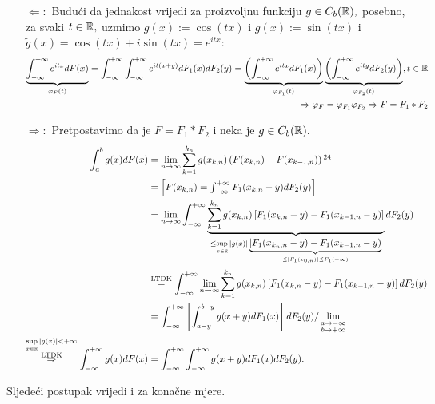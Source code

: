 \documentclass{article}
\begin{document}
\begin{itemize}
    \item[\(\boxed{\Leftarrow}:\)] Budući da jednakost vrijedi za proizvoljnu funkciju \(g\in C_b(\Bbb R),\) posebno, za svaki \(t\in\Bbb R,\) uzmimo \(g(x):=\cos(tx)\) i \(g(x):=\sin(tx)\) i \(\tilde g(x)=\cos(tx)+i\sin(tx)=e^{itx}\): \[\begin{aligned}\underbrace{\int_{-\infty}^{+\infty}e^{itx}dF(x)}_{\varphi_F(t)}=\int_{-\infty}^{+\infty}\int_{-\infty}^{+\infty}e^{it(x+y)}dF_1(x)dF_2(y)=\underbrace{\left(\int_{-\infty}^{+\infty}e^{itx}dF_1(x)\right)}_{\varphi_{F_1}(t)}\underbrace{\left(\int_{-\infty}^{+\infty}e^{ity}dF_2(y)\right)}_{\varphi_{F_2}(t)},t\in\Bbb R\\\Rightarrow\varphi_F=\varphi_{F_1}\varphi_{F_2}\Rightarrow F=F_1*F_2\end{aligned}\] 
    \item[\(\boxed{\Rightarrow}:\)] Pretpostavimo da je \(F=F_1*F_2\) i neka je \(g\in C_b(\Bbb R).\)   \[\begin{aligned}\int_a^bg(x)dF(x)&=\lim_{n\to\infty}\sum_{k=1}^{k_n}g(x_{k,n})\left(F(x_{k,n})-F(x_{k-1,n})\right)\footnotemark[24]\\&=\begin{bmatrix}F(x_{k,n})=\int_{-\infty}^{+\infty}F_1(x_{k,n}-y)dF_2(y)\end{bmatrix}\\&=\lim_{n\to\infty}\int_{-\infty}^{+\infty}\underbrace{\sum_{k=1}^{k_n}g(x_{k,n})\left[F_1(x_{k,n}-y)-F_1(x_{k-1,n}-y)\right]}_{\le\sup\limits_{x\in\Bbb R}|g(x)|\underbrace{|F_1(x_{k_n,n}-y)-F_1(x_{k-1,n}-y)}_{\le|F_1(x_{0,n})|\le F_1(+\infty)}}dF_2(y)\\&\overset{\text{LTDK}}{=}\int_{-\infty}^{+\infty}\lim_{n\to\infty}\sum_{k=1}^{k_n}g(x_{k,n})\left[F_1(x_{k,n}-y)-F_1(x_{k-1,n}-y)\right]dF_2(y)\\&=\int_{-\infty}^{+\infty}\left[\int_{a-y}^{b-y}g(x+y)dF_1(x)\right]dF_2(y)/\lim_{\substack{a\to-\infty\\b\to+\infty}}\\\overset{\substack{\sup\limits_{x\in\Bbb R}|g(x)|<+\infty\\\text{LTDK}}}{\Rightarrow}\int_{-\infty}^{+\infty}g(x)dF(x)&=\int_{-\infty}^{+\infty}\int_{-\infty}^{+\infty}g(x+y)dF_1(x)dF_2(y).\end{aligned}\] 
\end{itemize}
Sljedeći postupak vrijedi i za konačne mjere.\newline\newline
\end{document}
